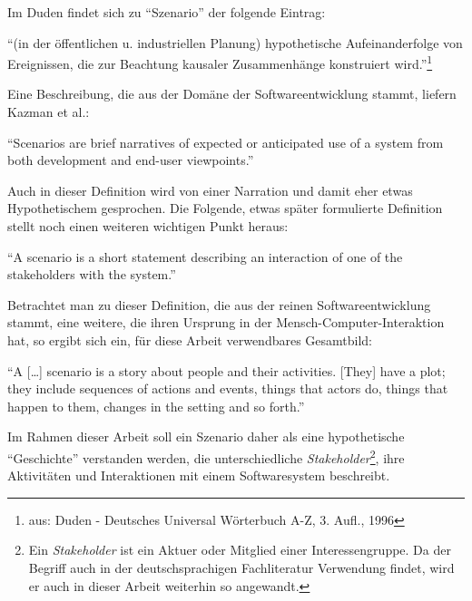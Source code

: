   Im Duden findet sich zu "`Szenario"' der folgende Eintrag:
  
  \begin{definition}\label{def:szenario_allg}
    "`(in der öffentlichen u. industriellen Planung) hypothetische Aufeinanderfolge von Ereignissen, die zur Beachtung kausaler Zusammenhänge konstruiert wird."'\footnote{aus: Duden - Deutsches Universal Wörterbuch A-Z, 3. Aufl., 1996}
  \end{definition}
  
  Eine Beschreibung, die aus der Domäne der Softwareentwicklung stammt, liefern Kazman et al.:
  
  \begin{definition}\label{def:szenario_kazman_et_al}
    "`Scenarios are brief narratives of expected or anticipated use of a system from both development and end-user viewpoints."' \emph{\citep[S. 2]{scenario_based_analysis_of_software_architecture}}
  \end{definition}
  
  Auch in dieser Definition wird von einer Narration und damit eher etwas Hypothetischem gesprochen. Die Folgende, etwas später formulierte Definition stellt noch einen weiteren wichtigen Punkt heraus:
  
  \begin{definition}\label{def:szenario_clements_et_al}
    "`A scenario is a short statement describing an interaction of one of the stakeholders with the system."' \emph{\citep[S. 33]{evaluating_software_architectures}}
  \end{definition}
  
  Betrachtet man zu dieser Definition, die aus der reinen Softwareentwicklung stammt, eine weitere, die ihren Ursprung in der Mensch-Computer-Interaktion hat, so ergibt sich ein, für diese Arbeit verwendbares Gesamtbild:
  
  \begin{definition}\label{def:szenario_carroll_rosson}
    "`A [\ldots] scenario is a story about people and their activities. [They] have a plot; they include sequences of actions and events, things that actors do, things that happen to them, changes in the setting and so forth."' \emph{\citep[S. 16/18]{scenario_based_development}}
  \end{definition}
  
  Im Rahmen dieser Arbeit soll ein Szenario daher als eine hypothetische "`Geschichte"' verstanden werden, die unterschiedliche \emph{Stakeholder}\footnote{Ein \emph{Stakeholder} ist ein Aktuer oder Mitglied einer Interessengruppe. Da der Begriff auch in der deutschsprachigen Fachliteratur Verwendung findet, wird er auch in dieser Arbeit weiterhin so angewandt.}, ihre Aktivitäten und Interaktionen mit einem Softwaresystem beschreibt.
  
